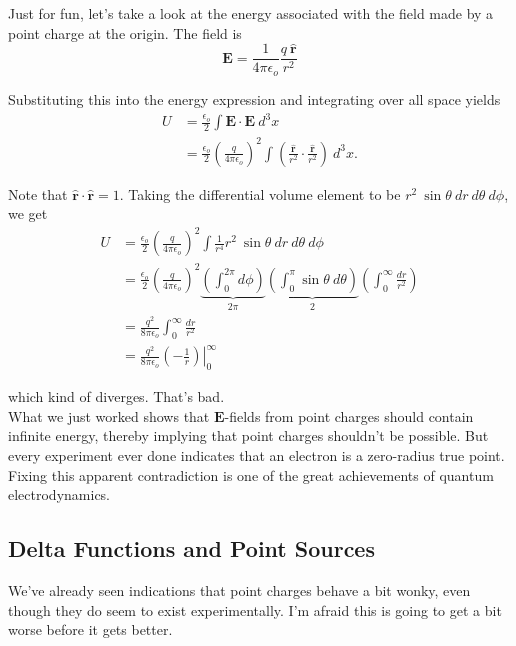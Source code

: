 \documentclass{article}
\numberwithin{equation}{section}
\newcommand{\rhat}{\mathbf{\hat{r}}}
\newcommand*\Eval[3]{\left.#1\right\rvert_{#2}^{#3}}
\begin{document}
Just for fun, let's take a look at the energy associated with the field made by a point charge at the origin. The field is
\begin{equation*}
    \bm{E} = \frac{1}{4\pi\epsilon_o} \frac{q\ \rhat}{r^2}
\end{equation*}

Substituting this into the energy expression and integrating over all space yields
\begin{align*}
    U &= \frac{\epsilon_o}{2} \int \bm{E} \cdot \bm{E}\ d^3x \\
    &= \frac{\epsilon_o}{2} \left( \frac{q}{4\pi\epsilon_o} \right)^2 \int \left( \frac{\rhat}{r^2} \cdot \frac{\rhat}{r^2} \right)\ d^3x.
\end{align*}

Note that $\rhat \cdot \rhat = 1$. Taking the differential volume element to be $r^2\ \sin{\theta}\ dr\ d\theta\ d\phi$, we get
\begin{align*}
    U &= \frac{\epsilon_o}{2} \left( \frac{q}{4\pi\epsilon_o} \right)^2 \int \frac{1}{r^4} r^2\ \sin{\theta}\ dr\ d\theta\ d\phi \\
    &= \frac{\epsilon_o}{2} \left( \frac{q}{4\pi\epsilon_o} \right)^2 \underbrace{\left( \int_0^{2\pi} d\phi \right)}_{\displaystyle 2\pi} \underbrace{\left( \int_0^{\pi} \sin{\theta}\ d\theta \right)}_{\displaystyle 2} \left( \int_0^{\infty} \frac{dr}{r^2} \right) \\
    &= \frac{q^2}{8\pi\epsilon_o} \int_0^{\infty} \frac{dr}{r^2} \\
    &= \frac{q^2}{8\pi\epsilon_o} \Eval{\left( -\frac{1}{r} \right)}{0}{\infty}
\end{align*}

which kind of diverges. That's bad. \\

What we just worked shows that $\bm{E}$-fields from point charges should contain infinite energy, thereby implying that point charges shouldn't be possible. But every experiment ever done indicates that an electron is a zero-radius true point. Fixing this apparent contradiction is one of the great achievements of quantum electrodynamics.

\subsection*{Delta Functions and Point Sources}

We've already seen indications that point charges behave a bit wonky, even though they do seem to exist experimentally. I'm afraid this is going to get a bit worse before it gets better. \\
\end{document}
